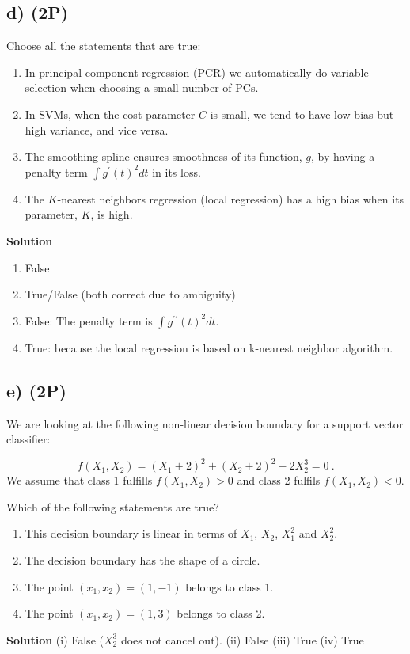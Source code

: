 \documentclass[
]{article}
\providecommand{\tightlist}{%
  \setlength{\itemsep}{0pt}\setlength{\parskip}{0pt}}
\begin{document}
\hypertarget{d-2p}{%
\subsection{d) (2P)}\label{d-2p}}

Choose all the statements that are true:

\begin{enumerate}
\def\labelenumi{(\roman{enumi})}
\tightlist
\item
  In principal component regression (PCR) we automatically do variable
  selection when choosing a small number of PCs.
\item
  In SVMs, when the cost parameter \(C\) is small, we tend to have low
  bias but high variance, and vice versa.
\item
  The smoothing spline ensures smoothness of its function, \(g\), by
  having a penalty term \(\int g^{\prime}(t)^2 dt\) in its loss.
\item
  The \(K\)-nearest neighbors regression (local regression) has a high
  bias when its parameter, \(K\), is high.
\end{enumerate}

\textbf{Solution}

\begin{enumerate}
\def\labelenumi{(\roman{enumi})}
\tightlist
\item
  False
\item
  True/False (both correct due to ambiguity)
\item
  False: The penalty term is \(\int g^{\prime \prime}(t)^2 dt\).
\item
  True: because the local regression is based on k-nearest neighbor
  algorithm.
\end{enumerate}

\hypertarget{e-2p}{%
\subsection{e) (2P)}\label{e-2p}}

We are looking at the following non-linear decision boundary for a
support vector classifier:

\[f(X_1,X_2) = (X_1+2)^2 + (X_2+2)^2 - 2 X_2^3  = 0 \ .\] We assume that
class 1 fulfills \(f(X_1,X_2) > 0\) and class 2 fulfils
\(f(X_1,X_2)<0\).

Which of the following statements are true?

\begin{enumerate}
\def\labelenumi{(\roman{enumi})}
\tightlist
\item
  This decision boundary is linear in terms of \(X_1\), \(X_2\),
  \(X_1^2\) and \(X_2^2\).
\item
  The decision boundary has the shape of a circle.
\item
  The point \((x_1,x_2)=(1,-1)\) belongs to class 1.
\item
  The point \((x_1,x_2)=(1,3)\) belongs to class 2.
\end{enumerate}

\textbf{Solution} (i) False (\(X_2^3\) does not cancel out). (ii) False
(iii) True (iv) True
\end{document}
